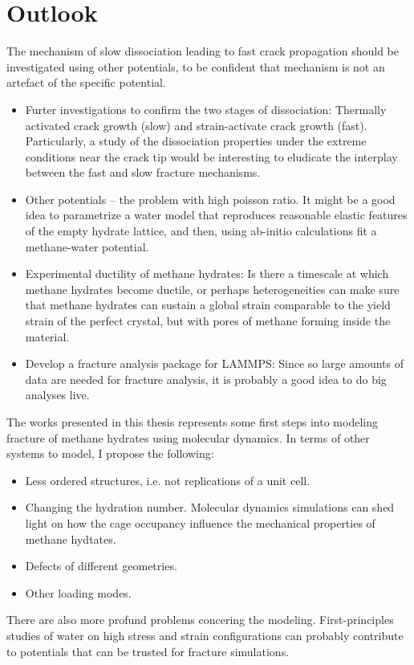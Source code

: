\section{Outlook}

The mechanism of slow dissociation leading to fast crack propagation should be investigated using other potentials, to be confident that mechanism is not an artefact of the specific potential.

\begin{itemize}
\item Furter investigations to confirm the two stages of dissociation: Thermally activated crack growth (slow) and strain-activate crack growth (fast). Particularly, a study of the dissociation properties under the extreme conditions near the crack tip would be interesting to eludicate the interplay between the fast and slow fracture mechanisms.
\item Other potentials -- the problem with high poisson ratio. It might be a good idea to parametrize a water model that reproduces reasonable elastic features of the empty hydrate lattice, and then, using ab-initio calculations fit a methane-water potential.
\item Experimental ductility of methane hydrates: Is there a timescale at which methane hydrates become ductile, or perhaps heterogeneities can make sure that methane hydrates can sustain a global strain comparable to the yield strain of the perfect crystal, but with pores of methane forming inside the material. 
\item Develop a fracture analysis package for LAMMPS: Since so large amounts of data are needed for fracture analysis, it is probably a good idea to do big analyses live.
\end{itemize}

The works presented in this thesis represents some first steps into modeling fracture of methane hydrates using molecular dynamics. In terms of other systems to model, I propose the following:
%
\begin{itemize}
\item Less ordered structures, i.e. not replications of a unit cell.
\item Changing the hydration number. Molecular dynamics simulations can shed light on how the cage occupancy influence the mechanical properties of methane hydtates.
\item Defects of different geometries.
\item Other loading modes.
\end{itemize}
%
There are also more profund problems concering the modeling. First-principles studies of water on high stress and strain configurations can probably contribute to potentials that can be trusted for fracture simulations. 

